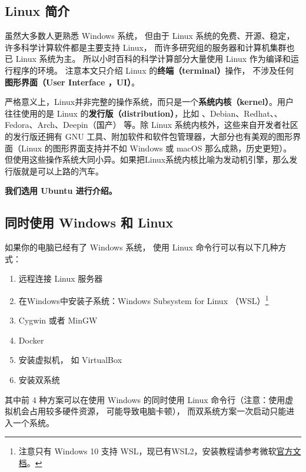 
\begin{issues}
\issueTODO
\end{issues}

\subsection{Linux 简介}
虽然大多数人更熟悉 Windows 系统， 但由于 Linux 系统的免费、开源、稳定， 许多科学计算软件都是主要支持 Linux， 而许多研究组的服务器和计算机集群也已 Linux 系统为主。 所以小时百科的科学计算部分大量使用 Linux 作为编译和运行程序的环境。 注意本文只介绍 Linux 的\textbf{终端（terminal）}操作， 不涉及任何\textbf{图形界面（User Interface ，UI）}。 

严格意义上，Linux并非完整的操作系统，而只是一个\textbf{系统内核（kernel）}。用户往往使用的是 Linux 的\textbf{发行版（distribution）}，比如 、Debian、Redhat、、Fedora、Arch、Deepin（国产） 等。除 Linux 系统内核外，这些来自开发者社区的发行版还拥有 GNU 工具、附加软件和软件包管理器，大部分也有美观的图形界面（Linux 的图形界面支持并不如 Windows 或 macOS 那么成熟，历史更短）。 但使用这些操作系统大同小异。如果把Linux系统内核比喻为发动机引擎，那么发行版就是可以上路的汽车。

\textbf{我们选用 Ubuntu 进行介绍。}


\subsection{同时使用 Windows 和 Linux}
如果你的电脑已经有了 Windows 系统， 使用 Linux 命令行可以有以下几种方式：
\begin{enumerate}
\item 远程连接 Linux 服务器
\item 在Windows中安装子系统：Windows Subsystem for Linux （WSL）\footnote{注意只有 Windows 10 支持 WSL，现已有WSL2，安装教程请参考微软\href{https://docs.microsoft.com/zh-cn/windows/wsl/install-win10}{官方文档}。} 
\item Cygwin 或者 MinGW
\item Docker
\item 安装虚拟机， 如 VirtualBox
\item 安装双系统
\end{enumerate}
其中前 4 种方案可以在使用 Windows 的同时使用 Linux 命令行（注意：使用虚拟机会占用较多硬件资源， 可能导致电脑卡顿）， 而双系统方案一次启动只能进入一个系统。

